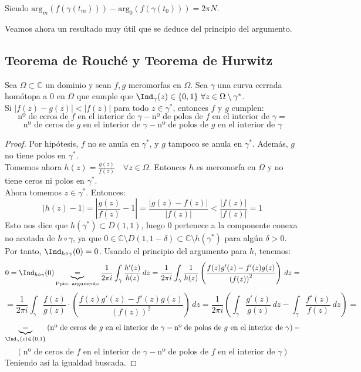 Siendo $\text{arg}_m(f(\gamma(t_m))) - \text{arg}_0(f(\gamma(t_0))) = 2 \pi N$.

Veamos ahora un resultado muy útil que se deduce del principio del argumento.

\subsection{Teorema de Rouché y Teorema de Hurwitz}

\begin{teorema}
    Sea $\Omega \subset \mathbb{C}$ un dominio y sean $f, g$ meromorfas en $\Omega$. Sea $\gamma$ una curva cerrada homótopa a $0$ en $\Omega$ que cumple que $\Ind_{\gamma}(z) \in \{0,1\} \ \forall z \in \Omega \setminus \gamma^*$.\\
    Si $|f(z) - g(z)| < |f(z)|$ para todo $z \in \gamma^*$, entonces $f$ y $g$ cumplen:
    \[
        \text{nº de ceros de } f \text{ en el interior de } \gamma - \text{nº de polos de } f \text{ en el interior de } \gamma =
    \]
    \[
    \text{nº de ceros de } g \text{ en el interior de } \gamma - \text{nº de polos de } g \text{ en el interior de } \gamma
    \]
\end{teorema}

\begin{proof}
    Por hipótesis, $f$ no se anula en $\gamma^*$, y $g$ tampoco se anula en $\gamma^*$. Además, $g$ no tiene polos en $\gamma^*$.\\
    Tomemos ahora $h(z) = \frac{g(z)}{f(z)} \quad \forall z \in \Omega$. Entonces $h$ es meromorfa en $\Omega$ y no tiene ceros ni polos en $\gamma^*$.\\
    Ahora tomemos $z \in \gamma^*$. Entonces:
    \[
    \left| h(z) - 1 \right| = 
    \left| \frac{g(z)}{f(z)} - 1 \right| =
    \frac{|g(z) - f(z)|}{|f(z)|} <
    \frac{|f(z)|}{|f(z)|} = 1
    \]
    Esto nos dice que $h(\gamma^*) \subset D(1,1)$, luego $0$ pertenece a la componente conexa no acotada de $h \circ \gamma$, ya que $0 \in \mathbb{C} \setminus D(1,1 - \delta) \subset \mathbb{C} \setminus h(\gamma^*)$ para algún $\delta > 0$.\\
    Por tanto, $\Ind_{h \circ \gamma}(0) = 0$. Usando el principio del argumento para $h$, tenemos:
    \[
    0 =
    \Ind_{h \circ \gamma}(0) \underbrace{=}_{\text{Ppio. argumento}}
    \frac{1}{2 \pi i} \int_{\gamma} \frac{h'(z)}{h(z)} \, dz =
    \frac{1}{2 \pi i} \int_{\gamma} \frac{1}{h(z)} \left( \frac{f(z)g'(z) - f'(z)g(z)}{\left(f(z)\right)^2} \right) \, dz =
    \]
    \[
    = \frac{1}{2 \pi i} \int_{\gamma} \frac{f(z)}{g(z)} \cdot \left( \frac{f(z)g'(z) - f'(z)g(z)}{\left(f(z)\right)^2} \right) \, dz =
    \frac{1}{2 \pi i} \left( \int_{\gamma} \frac{g'(z)}{g(z)} \, dz - \int_{\gamma} \frac{f'(z)}{f(z)} \, dz \right) =
    \]
    \[
    \underbrace{=}_{\Ind_{\gamma}(z) \in \{0,1\}}
    \left( \text{nº de ceros de } g \text{ en el interior de } \gamma - \text{nº de polos de } g \text{ en el interior de } \gamma \right) -
    \]
    \[
    \left( \text{nº de ceros de } f \text{ en el interior de } \gamma - \text{nº de polos de } f \text{ en el interior de } \gamma \right)
    \]
    Teniendo así la igualdad buscada.
\end{proof}

